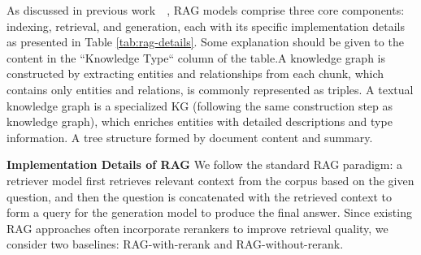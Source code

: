 \documentclass{article} %
\begin{document}
As discussed in previous work~~\citep{gao2023retrieval,lewis2020retrieval,zhou2025depth}, RAG models comprise three core components: indexing, retrieval, and generation, each with its specific implementation details as presented in Table \ref{tab:rag-details}.
Some explanation should be given to the content in the ``Knowledge Type`` column of the table.A knowledge graph is constructed by extracting entities and relationships from each chunk, which contains only entities and relations, is commonly represented as triples. A textual knowledge graph is a specialized KG (following the same construction step as knowledge graph), which enriches entities with detailed descriptions and type information. A tree structure formed by document content and summary.


\textbf{Implementation Details of RAG} We follow the standard RAG paradigm: a retriever model first retrieves relevant context from the corpus based on the given question, and then the question is concatenated with the retrieved context to form a query for the generation model to produce the final answer. Since existing RAG approaches often incorporate rerankers to improve retrieval quality, we consider two baselines: RAG-with-rerank and RAG-without-rerank.
\end{document}
